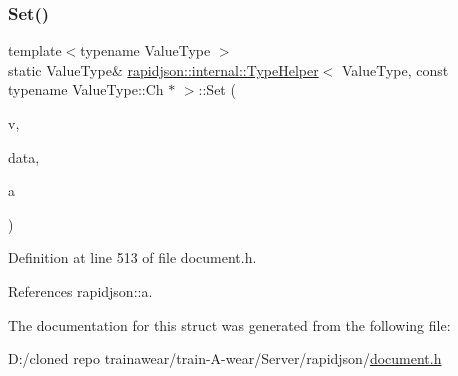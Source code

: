 \subsubsection{\texorpdfstring{Set()}{Set()}\hspace{0.1cm}{\footnotesize\ttfamily [2/2]}}
{\footnotesize\ttfamily template$<$typename Value\+Type $>$ \\
static Value\+Type\& \mbox{\hyperlink{structrapidjson_1_1internal_1_1_type_helper}{rapidjson\+::internal\+::\+Type\+Helper}}$<$ Value\+Type, const typename Value\+Type\+::\+Ch $\ast$ $>$\+::Set (\begin{DoxyParamCaption}\item[{Value\+Type \&}]{v,  }\item[{const \mbox{\hyperlink{structrapidjson_1_1internal_1_1_type_helper_3_01_value_type_00_01const_01typename_01_value_type_1_1_ch_01_5_01_4_a511422342701bd19c777d477275991e8}{String\+Type}}}]{data,  }\item[{typename Value\+Type\+::\+Allocator\+Type \&}]{a }\end{DoxyParamCaption})\hspace{0.3cm}{\ttfamily [static]}}



Definition at line 513 of file document.\+h.


\begin{DoxyCode}{0}

\end{DoxyCode}


References rapidjson\+::a.



The documentation for this struct was generated from the following file\+:\begin{DoxyCompactItemize}
\item 
D\+:/cloned repo trainawear/train-\/\+A-\/wear/\+Server/rapidjson/\mbox{\hyperlink{document_8h}{document.\+h}}\end{DoxyCompactItemize}
